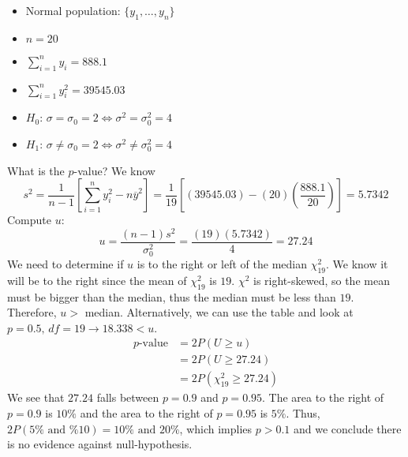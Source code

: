 \begin{exbox}
    \begin{example}\label{small u variance} $ \; $
        \begin{itemize}
            \item Normal population: $ \{y_1,\ldots ,y_n\} $
            \item $ n=20 $
            \item $ \sum\limits_{i=1}^{n} y_i=888.1 $
            \item $ \sum\limits_{i=1}^{n} y_i^2=39545.03 $
            \item $ H_0 $: $ \sigma=\sigma_0=2 \iff \sigma^2=\sigma_0^2=4 $
            \item $ H_1 $: $ \sigma\neq \sigma_0=2 \iff \sigma^2\neq \sigma_0^2=4 $
        \end{itemize}
        What is the $ p $-value?
        We know
        \[ s^2=\frac{1}{n-1} \left[ \sum\limits_{i=1}^{n} y_i^2-n\overline{y}^2 \right]
            =
            \frac{1}{19} \left[ (39545.03)-(20)\left( \frac{888.1}{20}  \right)  \right]
            =
            5.7342 \]
        Compute $ u $:
        \[ u=\frac{(n-1)s^2}{\sigma_0^2}
            =
            \frac{(19)(5.7342)}{4}
            =
            27.24 \]
        We need to determine if $ u $ is to the right or left of the median $ \chi^2_{19} $.
        We know it will be to the right since the mean of $ \chi^2_{19} $ is $ 19 $.
        $ \chi^2 $ is right-skewed, so the mean must be bigger than the median,
        thus the median must be less than $ 19 $. Therefore, $ u> $ median. Alternatively,
        we can use the table and look at $ p=0.5,\,df=19\rightarrow 18.338<u $.
        \begin{align*}
            p\text{-value}
             & =2P(U\geqslant u)               \\
             & =2P(U\geqslant 27.24)           \\
             & =2P(\chi^2_{19}\geqslant 27.24)
        \end{align*}
        We see that $ 27.24 $ falls between $ p=0.9 $ and $ p=0.95 $. The area to the right of
        $ p=0.9 $ is $ 10\% $ and the area to the right of $ p=0.95 $ is $ 5\% $.
        Thus, $ 2P(5\%\text{ and }\% 10)=10\%\text{ and } 20\% $,
        which implies $ p>0.1 $ and we conclude there is no evidence against null-hypothesis.
    \end{example}
\end{exbox}
